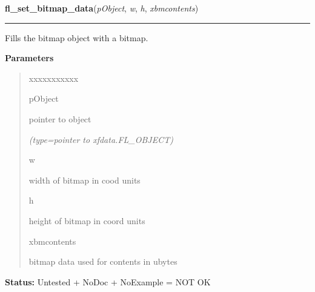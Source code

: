     \label{xformslib:library:fl_set_bitmap_data}

    \vspace{0.5ex}

\hspace{.8\funcindent}\begin{boxedminipage}{\funcwidth}

    \raggedright \textbf{fl\_set\_bitmap\_data}(\textit{pObject}, \textit{w}, \textit{h}, \textit{xbmcontents})

    \vspace{-1.5ex}

    \rule{\textwidth}{0.5\fboxrule}
\setlength{\parskip}{2ex}
    Fills the bitmap object with a bitmap.

\setlength{\parskip}{1ex}
      \textbf{Parameters}
      \vspace{-1ex}

      \begin{quote}
        \begin{Ventry}{xxxxxxxxxxx}

          \item[pObject]

          pointer to object

            {\it (type=pointer to xfdata.FL\_OBJECT)}

          \item[w]

          width of bitmap in cood units

          \item[h]

          height of bitmap in coord units

          \item[xbmcontents]

          bitmap data used for contents in ubytes

        \end{Ventry}

      \end{quote}

\textbf{Status:} Untested + NoDoc + NoExample = NOT OK



    \end{boxedminipage}

    \label{xformslib:library:fl_set_bitmap_file}

